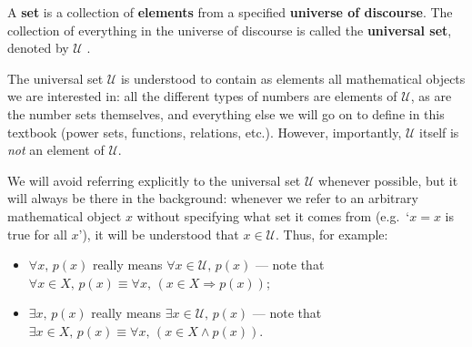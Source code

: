 \begin{definition}
\label{defSet}
A \textbf{set} is a collection of \textbf{elements} from a specified \textbf{universe of discourse}. The collection of everything in the universe of discourse is called the \textbf{universal set}, denoted by $\mathcal{U}$ .
\end{definition}

The universal set $\mathcal{U}$ is understood to contain as elements all mathematical objects we are interested in: all the different types of numbers are elements of $\mathcal{U}$, as are the number sets themselves, and everything else we will go on to define in this textbook (power sets, functions, relations, etc.). However, importantly, $\mathcal{U}$ itself is \textit{not} an element of $\mathcal{U}$.

We will avoid referring explicitly to the universal set $\mathcal{U}$ whenever possible, but it will always be there in the background: whenever we refer to an arbitrary mathematical object $x$ without specifying what set it comes from (e.g.\ `$x=x$ is true for all $x$'), it will be understood that $x \in \mathcal{U}$. Thus, for example:

\begin{itemize}
\item $\forall x,\, p(x)$ really means $\forall x \in \mathcal{U},\, p(x)$ --- note that $\forall x \in X,\, p(x) \equiv \forall x,\, (x \in X \Rightarrow p(x))$;
\item $\exists x,\, p(x)$ really means $\exists x \in \mathcal{U},\, p(x)$ --- note that $\exists x \in X,\, p(x) \equiv \forall x,\, (x \in X \wedge p(x))$.
\end{itemize}

